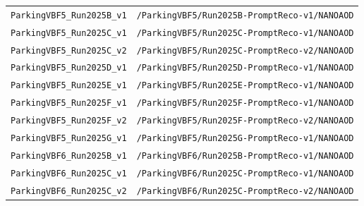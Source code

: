 \begin{longtable}{@{}>{\RaggedRight\arraybackslash}p{} >{\RaggedRight\arraybackslash}p{}@{}}
\addlinespace[2pt]
\texttt{ParkingVBF5\_\allowbreak{}Run2025B\_\allowbreak{}v1} & \texttt{/\allowbreak{}ParkingVBF5/\allowbreak{}Run2025B-\allowbreak{}PromptReco-\allowbreak{}v1/\allowbreak{}NANOAOD} \\
\addlinespace[2pt]
\texttt{ParkingVBF5\_\allowbreak{}Run2025C\_\allowbreak{}v1} & \texttt{/\allowbreak{}ParkingVBF5/\allowbreak{}Run2025C-\allowbreak{}PromptReco-\allowbreak{}v1/\allowbreak{}NANOAOD} \\
\addlinespace[2pt]
\texttt{ParkingVBF5\_\allowbreak{}Run2025C\_\allowbreak{}v2} & \texttt{/\allowbreak{}ParkingVBF5/\allowbreak{}Run2025C-\allowbreak{}PromptReco-\allowbreak{}v2/\allowbreak{}NANOAOD} \\
\addlinespace[2pt]
\texttt{ParkingVBF5\_\allowbreak{}Run2025D\_\allowbreak{}v1} & \texttt{/\allowbreak{}ParkingVBF5/\allowbreak{}Run2025D-\allowbreak{}PromptReco-\allowbreak{}v1/\allowbreak{}NANOAOD} \\
\addlinespace[2pt]
\texttt{ParkingVBF5\_\allowbreak{}Run2025E\_\allowbreak{}v1} & \texttt{/\allowbreak{}ParkingVBF5/\allowbreak{}Run2025E-\allowbreak{}PromptReco-\allowbreak{}v1/\allowbreak{}NANOAOD} \\
\addlinespace[2pt]
\texttt{ParkingVBF5\_\allowbreak{}Run2025F\_\allowbreak{}v1} & \texttt{/\allowbreak{}ParkingVBF5/\allowbreak{}Run2025F-\allowbreak{}PromptReco-\allowbreak{}v1/\allowbreak{}NANOAOD} \\
\addlinespace[2pt]
\texttt{ParkingVBF5\_\allowbreak{}Run2025F\_\allowbreak{}v2} & \texttt{/\allowbreak{}ParkingVBF5/\allowbreak{}Run2025F-\allowbreak{}PromptReco-\allowbreak{}v2/\allowbreak{}NANOAOD} \\
\addlinespace[2pt]
\texttt{ParkingVBF5\_\allowbreak{}Run2025G\_\allowbreak{}v1} & \texttt{/\allowbreak{}ParkingVBF5/\allowbreak{}Run2025G-\allowbreak{}PromptReco-\allowbreak{}v1/\allowbreak{}NANOAOD} \\
\addlinespace[2pt]
\texttt{ParkingVBF6\_\allowbreak{}Run2025B\_\allowbreak{}v1} & \texttt{/\allowbreak{}ParkingVBF6/\allowbreak{}Run2025B-\allowbreak{}PromptReco-\allowbreak{}v1/\allowbreak{}NANOAOD} \\
\addlinespace[2pt]
\texttt{ParkingVBF6\_\allowbreak{}Run2025C\_\allowbreak{}v1} & \texttt{/\allowbreak{}ParkingVBF6/\allowbreak{}Run2025C-\allowbreak{}PromptReco-\allowbreak{}v1/\allowbreak{}NANOAOD} \\
\addlinespace[2pt]
\texttt{ParkingVBF6\_\allowbreak{}Run2025C\_\allowbreak{}v2} & \texttt{/\allowbreak{}ParkingVBF6/\allowbreak{}Run2025C-\allowbreak{}PromptReco-\allowbreak{}v2/\allowbreak{}NANOAOD} \\

\end{longtable}
